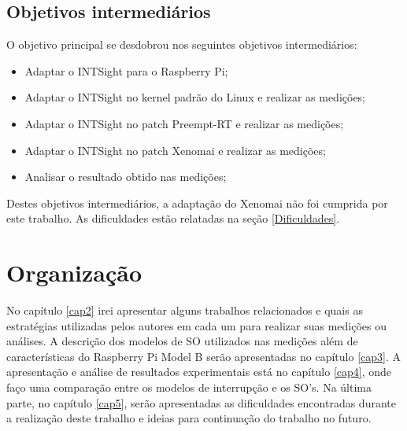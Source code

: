 \subsection{Objetivos intermediários}

O objetivo principal se desdobrou nos seguintes objetivos intermediários:

\begin{itemize}
    \item Adaptar o INTSight para o Raspberry Pi;
    \item Adaptar o INTSight no kernel padrão do Linux e realizar as medições;
    \item Adaptar o INTSight no patch Preempt-RT e realizar as medições;
    \item Adaptar o INTSight no patch Xenomai e realizar as medições;
    \item Analisar o resultado obtido nas medições;
\end{itemize}

Destes objetivos intermediários, a adaptação do Xenomai não foi cumprida por este trabalho. As dificuldades estão relatadas na seção \ref{Dificuldades}.

\section{Organização}

No capítulo \ref{cap2} irei apresentar alguns trabalhos relacionados e quais as estratégias utilizadas pelos autores em cada um para realizar suas medições ou análises. A descrição dos modelos de SO utilizados nas medições além de características do Raspberry Pi Model B serão apresentadas no capítulo \ref{cap3}. A apresentação e análise de resultados experimentais está no capítulo \ref{cap4}, onde faço uma comparação entre os modelos de interrupção e os SO's. Na última parte, no capítulo \ref{cap5}, serão apresentadas as dificuldades encontradas durante a realização deste trabalho e ideias para continuação do trabalho no futuro.
